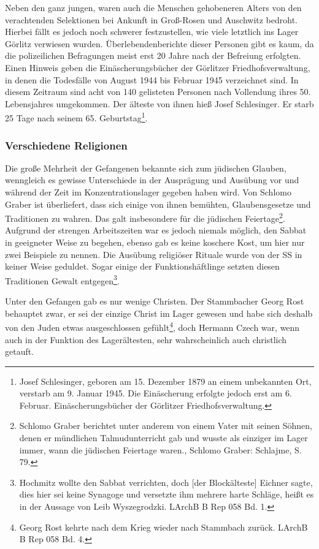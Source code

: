 Neben den ganz jungen, waren auch die Menschen gehobeneren Alters von den verachtenden Selektionen bei Ankunft in Groß-Rosen und Auschwitz bedroht. Hierbei fällt es jedoch noch schwerer festzustellen, wie viele letztlich ins Lager Görlitz verwiesen wurden. Überlebendenberichte dieser Personen gibt es kaum, da die polizeilichen Befragungen meist erst 20 Jahre nach der Befreiung erfolgten. Einen Hinweis geben die Einäscherungsbücher der Görlitzer Friedhofsverwaltung, in denen die Todesfälle von August 1944 bis Februar 1945 verzeichnet sind. In diesem Zeitraum sind acht von 140 gelisteten Personen nach Vollendung ihres 50. Lebensjahres umgekommen. Der älteste von ihnen hieß Josef Schlesinger. Er starb 25 Tage nach seinem 65. Geburtstag\footnote{Josef Schlesinger, geboren am 15. Dezember 1879 an einem unbekannten Ort, verstarb am 9. Januar 1945. Die Einäscherung erfolgte jedoch erst am 6. Februar. Einäscherungsbücher der Görlitzer Friedhofsverwaltung.}.\label{alter}

\subsubsection{Verschiedene Religionen}
Die große Mehrheit der Gefangenen bekannte sich zum jüdischen Glauben, wenngleich es gewisse Unterschiede in der Ausprägung und Ausübung vor und während der Zeit im Konzentrationslager gegeben haben wird. Von Schlomo Graber ist überliefert, dass sich einige von ihnen bemühten, Glaubensgesetze und Traditionen zu wahren. Das galt insbesondere für die jüdischen Feiertage\footnote{Schlomo Graber berichtet unter anderem von einem Vater mit seinen Söhnen, denen er mündlichen Talmudunterricht gab und \glqq wusste als einziger im Lager immer, wann die jüdischen Feiertage waren.\grqq, Schlomo Graber: Schlajme, S. 79.}. Aufgrund der strengen Arbeitszeiten war es jedoch niemals möglich, den Sabbat in geeigneter Weise zu begehen, ebenso gab es keine koschere Kost, um hier nur zwei Beispiele zu nennen.
Die Ausübung religiöser Rituale wurde von der SS in keiner Weise geduldet. Sogar einige der Funktionshäftlinge setzten diesen Traditionen Gewalt entgegen\footnote{ Hochmitz wollte den Sabbat verrichten, doch [der Blockälteste] Eichner sagte, dies hier sei keine Synagoge und versetzte ihm mehrere harte Schläge\grqq, heißt es in der Aussage von Leib Wyszegrodzki. LArchB B Rep 058 Bd. 1.}.

Unter den Gefangen gab es nur wenige Christen. Der Stammbacher Georg Rost behauptet zwar, er sei der einzige Christ im Lager gewesen und habe sich deshalb von den Juden etwas ausgeschlossen gefühlt\footnote{Georg Rost kehrte nach dem Krieg wieder nach Stammbach zurück. LArchB B Rep 058 Bd. 4.}, doch Hermann Czech war, wenn auch in der Funktion des Lagerältesten, sehr wahrscheinlich auch christlich getauft.

